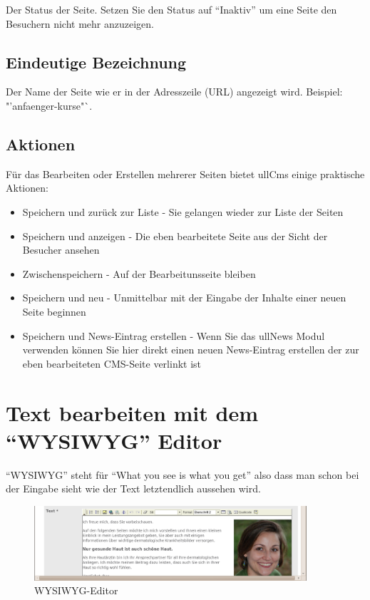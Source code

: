 \documentclass[article, a4paper, oneside, 11pt]{memoir}
\begin{document}
Der Status der Seite. Setzen Sie den Status auf "`Inaktiv"' um eine Seite den Besuchern nicht mehr anzuzeigen.

\subsection{Eindeutige Bezeichnung}

Der Name der Seite wie er in der Adresszeile (URL) angezeigt wird. Beispiel: "'anfaenger-kurse"`.

\subsection{Aktionen}

Für das Bearbeiten oder Erstellen mehrerer Seiten bietet ullCms einige praktische Aktionen:

\begin{itemize}
\item Speichern und zurück zur Liste - Sie gelangen wieder zur Liste der Seiten
\item Speichern und anzeigen - Die eben bearbeitete Seite aus der Sicht der Besucher ansehen
\item Zwischenspeichern - Auf der Bearbeitunsseite bleiben
\item Speichern und neu - Unmittelbar mit der Eingabe der Inhalte einer neuen Seite beginnen
\item Speichern und News-Eintrag erstellen - Wenn Sie das ullNews Modul verwenden können Sie hier direkt einen neuen News-Eintrag erstellen der zur eben bearbeiteten CMS-Seite verlinkt ist
\end{itemize}

\section{Text bearbeiten mit dem "`WYSIWYG"' Editor}
\label{sec:editor}

"`WYSIWYG"' steht für "`What you see is what you get"' also dass man schon bei der Eingabe sieht wie der Text letztendlich aussehen wird.

\begin{figure}[htp]
\centering
\includegraphics[width=0.9\textwidth]{editor}
\caption{WYSIWYG-Editor}
\label{fig:editor}
\end{figure}
\end{document}
